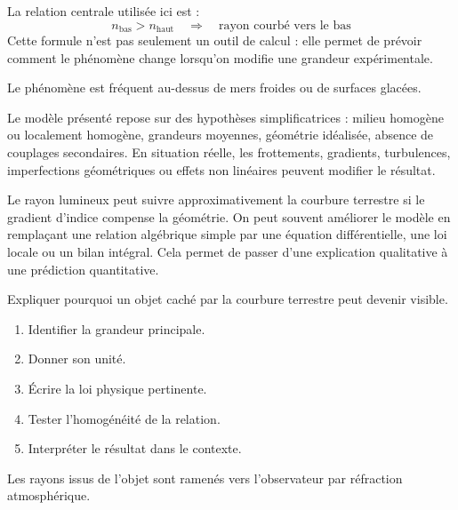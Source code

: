 \documentclass[11pt,a4paper]{article}
\begin{document}
\begin{theorembox}
La relation centrale utilisée ici est :
\[
n_{\mathrm{bas}}>n_{\mathrm{haut}}\quad\Rightarrow\quad \text{rayon courbé vers le bas}
\]
Cette formule n'est pas seulement un outil de calcul : elle permet de prévoir comment le phénomène change lorsqu'on modifie une grandeur expérimentale.
\end{theorembox}

\begin{odgbox}
Le phénomène est fréquent au-dessus de mers froides ou de surfaces glacées.
\end{odgbox}

\begin{attentionbox}
Le modèle présenté repose sur des hypothèses simplificatrices : milieu homogène ou localement homogène, grandeurs moyennes, géométrie idéalisée, absence de couplages secondaires. En situation réelle, les frottements, gradients, turbulences, imperfections géométriques ou effets non linéaires peuvent modifier le résultat.
\end{attentionbox}

\begin{approfondissementbox}
Le rayon lumineux peut suivre approximativement la courbure terrestre si le gradient d'indice compense la géométrie.
On peut souvent améliorer le modèle en remplaçant une relation algébrique simple par une équation différentielle, une loi locale ou un bilan intégral. Cela permet de passer d'une explication qualitative à une prédiction quantitative.
\end{approfondissementbox}

\begin{exercicebox}
Expliquer pourquoi un objet caché par la courbure terrestre peut devenir visible.
\begin{enumerate}
  \item Identifier la grandeur principale.
  \item Donner son unité.
  \item Écrire la loi physique pertinente.
  \item Tester l'homogénéité de la relation.
  \item Interpréter le résultat dans le contexte.
\end{enumerate}
\end{exercicebox}

\begin{corrigebox}[Indication]
Les rayons issus de l'objet sont ramenés vers l'observateur par réfraction atmosphérique.
\end{corrigebox}
\end{document}
